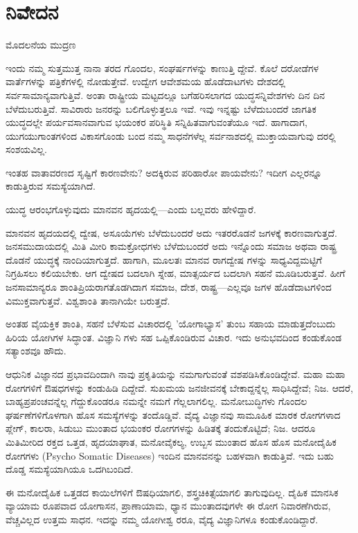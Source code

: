 
\chapter*{ನಿವೇದನ}

\begin{center}
ಮೊದಲನೆಯ ಮುದ್ರಣ
\end{center}

ಇಂದು ನಮ್ಮ ಸುತ್ತಮುತ್ತ ನಾನಾ ತರದ ಗೊಂದಲ, ಸಂಘರ್ಷಗಳನ್ನು ಕಾಣುತ್ತಿ ದ್ದೇವೆ. ಕೊಲೆ ದರೋಡೆಗಳ ವಾರ್ತೆಗಳನ್ನು ಪತ್ರಿಕೆಗಳಲ್ಲಿ ನೋಡುತ್ತೇವೆ. ಉದ್ವೇಗ ಆವೇಶಮಯ ಹೊಡೆದಾಟಗಳು ದೇಶದಲ್ಲಿ ಸರ್ವಸಾಮಾನ್ಯವಾಗುತ್ತಿವೆ. ಅಂತಾ ರಾಷ್ಟ್ರೀಯ ಮಟ್ಟದಲ್ಲೂ ಬಗೆಹರಿಸಲಾಗದ ಯುದ್ಧಸನ್ನಿವೇಶಗಳು ದಿನ ದಿನ ಬೆಳೆದುಬರುತ್ತಿವೆ. ಸಾವಿರಾರು ಜನರನ್ನು ಬಲಿಗೊಳ್ಳುತ್ತಲೂ ಇವೆ. ಇವು ಇನ್ನಷ್ಟು ಬೆಳೆದುಬಂದರೆ ಜಾಗತಿಕ ಯುದ್ಧದಲ್ಲೇ ಪರ್ಯವಸಾನವಾಗುವ ಭಯಂಕರ ಪರಿಸ್ಥಿತಿ ಸನ್ನಿಹಿತವಾಗುವಂತೆಯೂ ಇದೆ. ಹಾಗಾದಾಗ, ಯುಗಯುಗಾಂತಗಳಿಂದ ವಿಕಾಸಗೊಂಡು ಬಂದ ನಮ್ಮ ಸಾಧನೆಗಳೆಲ್ಲ ಸರ್ವನಾಶದಲ್ಲಿ ಮುಕ್ತಾಯವಾಗುವು ದರಲ್ಲಿ ಸಂಶಯವಿಲ್ಲ.

ಇಂತಹ ವಾತಾವರಣದ ಸೃಷ್ಟಿಗೆ ಕಾರಣವೇನು? ಅದಕ್ಕಿರುವ ಪರಿಹಾರೋ ಪಾಯವೇನು? ಇದೀಗ ಎಲ್ಲರನ್ನೂ ಕಾಡುತ್ತಿರುವ ಸಮಸ್ಯೆಯಾಗಿದೆ.

 ಯುದ್ಧ ಆರಂಭಗೊಳ್ಳುವುದು ಮಾನವನ ಹೃದಯಲ್ಲಿ—ಎಂದು ಬಲ್ಲವರು ಹೇಳಿದ್ದಾರೆ.

ಮಾನವನ ಹೃದಯದಲ್ಲಿ ದ್ವೇಷ, ಅಸೂಯೆಗಳು ಬೆಳೆದುಬಂದರೆ ಅದು ಇತರರೊಡನೆ ಜಗಳಕ್ಕೆ ಕಾರಣವಾಗುತ್ತದೆ. ಜನಸಮುದಾಯದಲ್ಲಿ ಮಿತಿ ಮೀರಿ ಕಾಮಕ್ರೋಧಗಳು ಬೆಳೆದುಬಂದರೆ ಅದು ಇನ್ನೊಂದು ಸಮಾಜ ಅಥವಾ ರಾಷ್ಟ್ರ ದೊಡನೆ ಯುದ್ಧಕ್ಕೆ ನಾಂದಿಯಾಗುತ್ತದೆ. ಹಾಗಾಗಿ, ಮೂಲತಃ ಮಾನವ ರಾಗದ್ವೇಷ ಗಳನ್ನು ಸಾಧ್ಯವಿದ್ದಮಟ್ಟಿಗೆ ನಿಗ್ರಹಿಸಲು ಕಲಿಯಬೇಕು. ಆಗ ದ್ವೇಷದ ಬದಲಾಗಿ ಸ್ನೇಹ, ಮಾತ್ಸರ್ಯದ ಬದಲಾಗಿ ಸಹನೆ ಮೂಡಿಬರುತ್ತವೆ. ಹೀಗೆ ಜನಸಾಮಾನ್ಯರೂ ಶಾಂತಿಪ್ರಿಯರಾಗತೊಡಗಿದಾಗ ಸಮಾಜ, ದೇಶ, ರಾಷ್ಟ್ರ—ಎಲ್ಲವೂ ಜಗಳ ಹೊಡೆದಾಟಗಳಿಂದ ವಿಮುಕ್ತವಾಗುತ್ತವೆ. ವಿಶ್ವಶಾಂತಿ ತಾನಾಗಿಯೇ ಬರುತ್ತದೆ.

ಅಂತಹ ವೈಯಕ್ತಿಕ ಶಾಂತಿ, ಸಹನೆ ಬೆಳೆಸುವ ವಿಚಾರದಲ್ಲಿ 'ಯೋಗಾಭ್ಯಾಸ' ತುಂಬ ಸಹಾಯ ಮಾಡುತ್ತದೆಂಬುದು ಹಿರಿಯ ಯೋಗಿಗಳ ಸಿದ್ಧಾಂತ. ವಿಜ್ಞಾನಿ ಗಳು ಸಹ ಒಪ್ಪಿಕೊಂಡಿರುವ ವಿಚಾರ. ಇದು ಅನುಭವದಿಂದ ಕಂಡುಕೊಂಡ ಸತ್ಯಾಂಶವೂ ಹೌದು.

ಆಧುನಿಕ ವಿಜ್ಞಾನದ ಪ್ರಭಾವದಿಂದಾಗಿ ನಾವು ಪ್ರಕೃತಿಯನ್ನು ನಮಗಾಗುವಂತೆ ವಶಪಡಿಸಿಕೊಂಡಿದ್ದೇವೆ. ಮಹಾ ಮಹಾ ರೋಗಗಳಿಗೆ ಔಷಧಗಳನ್ನು ಕಂಡುಹಿಡಿ ದಿದ್ದೇವೆ. ಸುಖಮಯ ಜನಜೀವನಕ್ಕೆ ಬೇಕಾದ್ದನ್ನೆಲ್ಲ ಸಾಧಿಸಿದ್ದೇವೆ; ನಿಜ. ಆದರೆ, ಬಾಹ್ಯಪ್ರಪಂಚವನ್ನೆಲ್ಲ ಗೆದ್ದುಕೊಂಡರೂ ನಮನ್ನೇ ನಮಗೆ ಗೆಲ್ಲಲಾಗಲಿಲ್ಲ. ಮನೋಬುದ್ಧಿಗಳು ಗೊಂದಲ ಘರ್ಷಣೆಗಳಿಗೊಳಗಾಗಿ ಹೊಸ ಸಮಸ್ಯೆಗಳನ್ನು ತಂದೊಡ್ಡಿವೆ. ವೈದ್ಯ ವಿಜ್ಞಾನವು ಸಾಮೂಹಿಕ ಮಾರಕ ರೋಗಗಳಾದ ಪ್ಲೇಗ್, ಕಾಲರಾ, ಸಿಡುಬು ಮುಂತಾದ ಭಯಂಕರ ರೋಗಗಳನ್ನು ಹಿಡಿತಕ್ಕೆ ತಂದುಕೊಟ್ಟಿದೆ; ನಿಜ. ಆದರೂ ಮಿತಿಮೀರಿದ ರಕ್ತದ ಒತ್ತಡ, ಹೃದಯಾಘಾತ, ಮನೋವೈಕಲ್ಯ, ಉಬ್ಬಸ ಮುಂತಾದ ಹೊಸ ಹೊಸ ಮನೋದೈಹಿಕ ರೋಗಗಳು (Psycho Somatic Diseases) ಇಂದಿನ ಮಾನವನನ್ನು ಬಹಳವಾಗಿ ಕಾಡುತ್ತಿವೆ. ಇದು ಬಹು ದೊಡ್ಡ ಸಮಸ್ಯೆಯಾಗಿಯೂ ಒದಗಿಬಂದಿದೆ.

ಈ ಮನೋದೈಹಿಕ ಒತ್ತಡದ  ಕಾಯಿಲೆಗಳಿಗೆ ಔಷಧಿಯಾಗಲಿ, ಶಸ್ತ್ರಚಿಕಿತ್ಸೆಯಾಗಲಿ ತಾಗುವುದಿಲ್ಲ. ದೈಹಿಕ ಮಾನಸಿಕ ವ್ಯಾಯಾಮ ರೂಪವಾದ ಯೋಗಾಸನ, ಪ್ರಾಣಾಯಾಮ, ಧ್ಯಾನ ಮುಂತಾದವುಗಳೇ ಈ ರೋಗ ನಿವಾರಣೆಗಿರುವ, ವೆಚ್ಚವಿಲ್ಲದ ಉತ್ತಮ ಸಾಧನ. ಇದನ್ನು ನಮ್ಮ ಯೋಗೀಶ್ವ ರರೂ, ವೈದ್ಯ ವಿಜ್ಞಾನಿಗಳೂ ಕಂಡುಕೊಂಡಿದ್ದಾರೆ.


